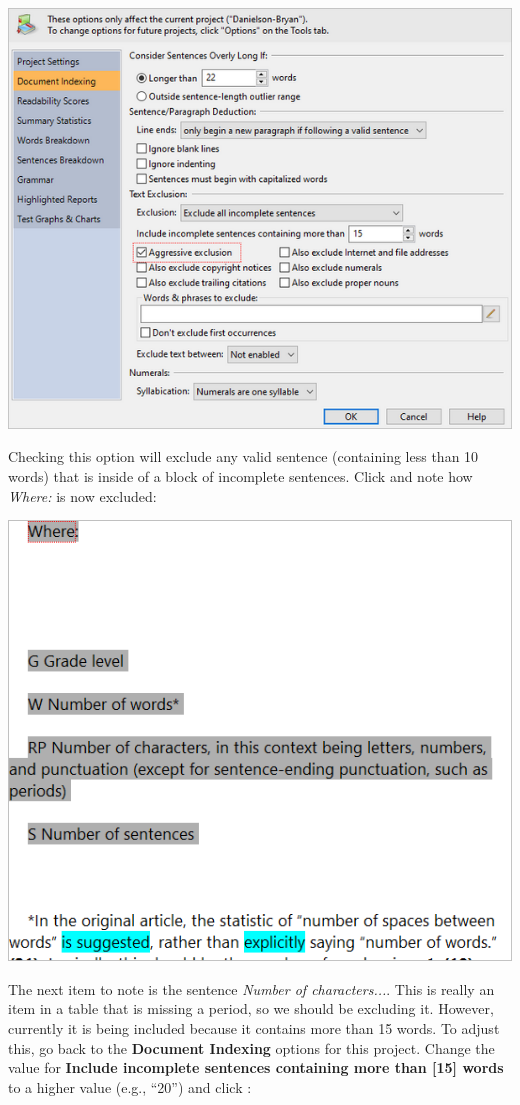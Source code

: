 \documentclass[
]{book}
\theoremstyle{definition}
\theoremstyle{definition}
\theoremstyle{definition}
\theoremstyle{definition}
\theoremstyle{remark}
\begin{document}
\includegraphics{Images/ExclusionExampleAggressiveList.png}

Checking this option will exclude any valid sentence (containing less than 10 words) that is inside of a block of incomplete sentences. Click  and note how \emph{Where:} is now excluded:

\includegraphics{Images/ExclusionExampleWhereExcluded.png}

The next item to note is the sentence \emph{Number of characters...}. This is really an item in a table that is missing a period, so we should be excluding it. However, currently it is being included because it contains more than 15 words. To adjust this, go back to the \textbf{Document Indexing} options for this project. Change the value for \textbf{Include incomplete sentences containing more than {[}15{]} words} to a higher value (e.g., ``20'') and click :
\end{document}
